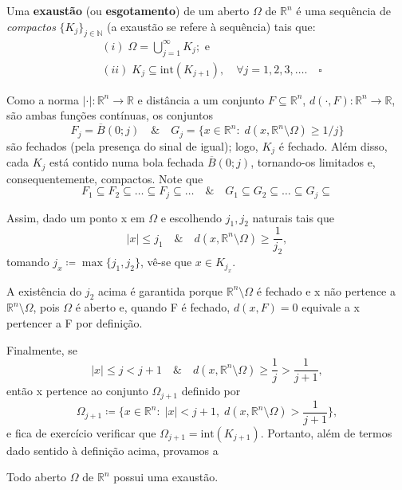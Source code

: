 \documentclass[../distribution_theory_notes.tex]{subfiles}
\begin{document}
 \begin{def*}
   Uma \textbf{exaustão} (ou \textbf{esgotamento}) de um aberto \(\Omega \) de \(\mathbb{R}^{n}\) é uma sequência de \textit{compactos} \(\{K_{j}\}_{j\in \mathbb{N}}\) (a exaustão se refere à sequência) tais que: 
  \begin{align*}
    &(i)\; \Omega =\bigcup_{j=1}^{\infty}K_{j}; \text{ e}\\ 
    &(ii)\; K_{j}\subseteq \mathrm{int}(K_{j+1}),\quad \forall j=1,2,3, \dotsc .\quad \square
  \end{align*}
 \end{def*}
 Como a norma \(|\cdot |:\mathbb{R}^{n}\rightarrow \mathbb{R}\) e  distância a um conjunto \(F\subseteq \mathbb{R}^{n}\), \(d(\cdot , F):\mathbb{R}^{n}\rightarrow \mathbb{R}\), são ambas funções contínuas, os conjuntos 
   \[
     F_{j}=\overline{B}(0; j)\quad\&\quad G_{j}=\{x\in \mathbb{R}^{n}:\; d(x, \mathbb{R}^{n}\setminus{\Omega })\geq 1/j\}
   \]
   são fechados (pela presença do sinal de igual); logo, \(K_{j}\) é fechado. Além disso, cada \(K_{j}\) está contido numa bola fechada \(\overline{B}(0; j)\), tornando-os limitados e, consequentemente, compactos. Note que 
     \[
       F_1\subseteq F_2\subseteq \dotsc \subseteq F_{j}\subseteq \dotsc \quad\&\quad G_1\subseteq G_2\subseteq \dotsc \subseteq G_{j}\subseteq
     \]

     Assim, dado um ponto x em \(\Omega \) e escolhendo \(j_1, j_2\) naturais tais que 
       \[
         |x|\leq j_1 \quad\&\quad d(x, \mathbb{R}^{n}\setminus{\Omega })\geq \frac{1}{j_2},
       \]
       tomando \(j_{x}\coloneqq \max\{j_1, j_2\}\), vê-se que \(x\in K_{j_{x}}\).
        \begin{tcolorbox}[
        skin=enhanced,
        title=Observação,
        fonttitle=\bfseries,
      colframe=black,
        colbacktitle=cyan!75!white, 
        colback=cyan!15,
        colbacklower=black,
      coltitle=black,
        drop fuzzy shadow,
        ]
        A existência do \(j_2\) acima é garantida porque \(\mathbb{R}^{n}\setminus{\Omega }\) é fechado e x não pertence a \(\mathbb{R}^{n}\setminus{\Omega }\), pois \(\Omega \) é aberto e, quando F é fechado, \(d(x, F)= 0\) equivale a x pertencer a F por definição.
        \end{tcolorbox}

        Finalmente, se 
        \[
          |x|\leq j<j+1 \quad\&\quad d(x, \mathbb{R}^{n}\setminus{\Omega })\geq \frac{1}{j} >\frac{1}{j+1},
      \]
      então x pertence ao conjunto \(\Omega _{j+1}\) definido por 
        \[
          \Omega_{j+1}\coloneqq \biggl\{x\in \mathbb{R}^{n}:\; |x|<j+1,\; d(x, \mathbb{R}^{n}\setminus{\Omega })>\frac{1}{j+1}\biggr\},
        \]
        e fica de exercício verificar que \(\Omega_{j+1}=\mathrm{int}(K_{j+1})\). Portanto, além de termos dado sentido à definição acima, provamos a 
       \begin{prop*}
         Todo aberto \(\Omega \) de \(\mathbb{R}^{n}\) possui uma exaustão.
       \end{prop*}
\end{document}
